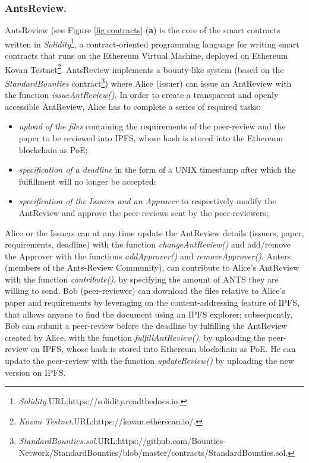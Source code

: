 \documentclass[runningheads]{llncs}
\begin{document}
\subsubsection{AntsReview.}
AntsReview (see Figure \ref{fig:contracts} (\textbf{a}) is the core of the smart contracts written in \emph{Solidity}\footnote[7]{\emph{Solidity}.\textsc{URL:}https://solidity.readthedocs.io.}, a contract-oriented programming language for writing smart contracts that runs on the Ethereum Virtual Machine, deployed on Ethereum Kovan Testnet\footnote[8]{\emph{Kovan Testnet}.\textsc{URL:}https://kovan.etherscan.io/.}. AntsReview implements a bounty-like system (based on the \emph{StandardBounties} contract\footnote[9]{\emph{StandardBounties.sol}.\textsc{URL:}https://github.com/Bounties-Network/StandardBounties/blob/master/contracts/StandardBounties.sol.}) where Alice (issuer) can issue an AntReview with the function \emph{issueAntReview()}.
\newline In order to create a transparent and openly accessible AntReview, Alice has to complete a series of required tasks:
 \begin{itemize}
     \item \emph{upload of the files} containing the requirements of the peer-review and the paper to be reviewed into IPFS, whose hash is stored into the Ethereum blockchain as PoE;
     \item \emph{specification of a deadline} in the form of a UNIX timestamp after which the fulfillment will no longer be accepted;
     \item \emph{specification of the Issuers and an Approver} to respectively modify the AntReview and approve the peer-reviews sent by the peer-reviewers;
\end{itemize}
 Alice or the Issuers can at any time update the AntReview details (issuers, paper, requirements, deadline) with the function \emph{changeAntReview()} and add/remove the Approver with the functions \emph{addApprover()} and \emph{removeApprover()}.
 Anters (members of the Ants-Review Community), can contribute to Alice's AntReview with the function \emph{contribute()}, by specifying the amount of ANTS they are willing to send.
 Bob (peer-reviewer) can download the files relative to Alice's paper and requirements by leveraging on the content-addressing feature of IPFS, that allows anyone to find the document using an IPFS explorer; subsequently, Bob can submit a peer-review before the deadline by fulfilling the AntReview created by Alice, with the function \emph{fulfillAntReview()}, by uploading the peer-review on IPFS, whose hash is stored into Ethereum blockchain as PoE. He can update the peer-review with the function \emph{updateReview()} by uploading the new version on IPFS.
\end{document}

